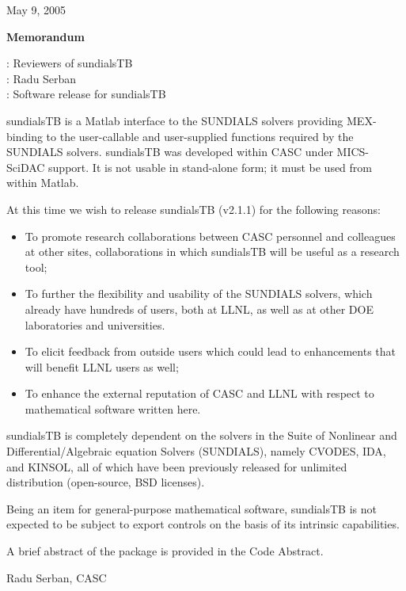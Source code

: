 \documentclass[12pt]{letter}
\begin{document}
\pagestyle{empty}

\begin{letter}

\hfill May 9, 2005

\vspace{0.2in}
\centerline{\bf Memorandum}

: Reviewers of sundialsTB \\
: Radu Serban \\
: Software release for sundialsTB

sundialsTB is a Matlab interface to the SUNDIALS solvers providing MEX-binding to 
the user-callable and user-supplied functions required by the SUNDIALS solvers.
sundialsTB was developed within CASC under MICS-SciDAC support. 
It is not usable in stand-alone form; it must be used from within Matlab.

At this time we wish to release sundialsTB (v2.1.1) for the following reasons:
\begin{itemize}
\item To promote research collaborations between CASC personnel and colleagues at 
      other sites, collaborations in which sundialsTB will be useful as a research tool;
\item To further the flexibility and usability of the SUNDIALS solvers, which already
      have hundreds of users, both at LLNL, as well as at other DOE laboratories and
      universities.
\item To elicit feedback from outside users which could lead to enhancements that will 
      benefit LLNL users as well;
\item To enhance the external reputation of CASC and LLNL with respect to 
      mathematical software written here.
\end{itemize}

sundialsTB is completely dependent on the solvers in the Suite of Nonlinear and 
Differential/Algebraic equation Solvers (SUNDIALS), namely CVODES, IDA, and KINSOL, 
all of which have been previously released for unlimited distribution (open-source,
BSD licenses).

Being an item for general-purpose mathematical software, sundialsTB is not expected to be 
subject to export controls on the basis of its intrinsic capabilities.

A brief abstract of the package is provided in the Code Abstract. 


\vspace{0.5in}                 
\hfill Radu Serban, CASC

\end{letter}
\end{document}
